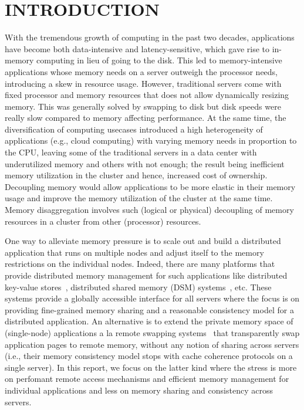 \section{INTRODUCTION}
\label{sec:intro}

With the tremendous growth of computing in the past two 
decades, applications have become both data-intensive 
and latency-sensitive, which gave rise to in-memory 
computing in lieu of going to the disk. 
This led to memory-intensive 
applications whose memory needs on a server outweigh the 
processor needs, introducing a skew in resource usage.
However, traditional servers come with fixed processor 
and memory resources that does not allow dynamically
resizing memory. This was generally solved by swapping 
to disk but disk speeds were really slow compared to memory 
affecting performance. 
At the same time, the diversification of computing usecases 
introduced a high heterogeneity of applications (e.g., cloud 
computing) with varying memory needs in proportion to 
the CPU, leaving some of the traditional servers in a data center  
with underutilized memory and others with not enough; the result
being inefficient memory utilization in the cluster and hence,
increased cost of ownership. Decoupling memory would allow 
applications to be more elastic in their memory usage and 
improve the memory utilization of the cluster at the same time.
Memory disaggregation involves such (logical or physical) 
decoupling of memory resources in a cluster from other 
(processor) resources. 

One way to alleviate memory pressure is to scale out and 
build a distributed application that runs on multiple nodes and 
adjust itself to the memory restrictions on the individual 
nodes. Indeed, there are many platforms that provide distributed 
memory management for such applications like distributed key-value 
stores~\cite{Ousterhout2010,Lim2012,Novakovic2016,Kalia2015},
distributed shared memory (DSM) 
systems~\cite{treadmarks,dsm1,farm,gam}, etc. These systems 
provide a globally accessible interface for all servers where  
the focus is on providing fine-grained memory sharing and 
a reasonable consistency model for a distributed application. 
An alternative is to extend the private memory space 
of (single-node) applications a la 
remote swapping systems~\cite{gms,cashmere} that transparently
swap application pages to remote memory, without any notion 
of sharing across servers (i.e., their memory consistency model 
stops with cache coherence protocols on a 
single server). In this report, we focus 
on the latter kind where the stress is more on perfomant 
remote access mechanisms and efficient memory management for 
individual applications and less on memory sharing and 
consistency across servers.

